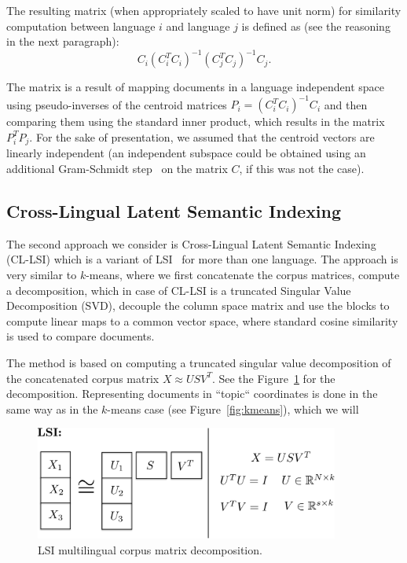 \documentclass[twoside,11pt]{article}
\begin{document}
The resulting matrix (when appropriately scaled to have unit norm) for similarity computation between language $i$ and language $j$ is defined as (see the reasoning in the next paragraph):
$$C_i(C_i^T C_i)^{-1} (C_j^T C_j)^{-1} C_j.$$

The matrix is a result of mapping documents in a language independent space using pseudo-inverses of the centroid matrices $P_i = (C_i^T C_i)^{-1} C_i$ and then comparing them using the standard inner product, which results in the matrix $P_i^T P_j$. For the sake of presentation, we assumed that the centroid vectors are linearly independent (an independent subspace could be obtained using an additional Gram-Schmidt step~\cite{golub} on the matrix $C$, if this was not the case).

\subsection{Cross-Lingual Latent Semantic Indexing}\label{sec:LSI}

The second approach we consider is Cross-Lingual Latent Semantic Indexing (CL-LSI)\cite{cl_lsi} which is a variant of LSI~ for more than one language. The approach is very similar to $k$-means, where we first concatenate the corpus matrices, compute a decomposition, which in case of CL-LSI is a truncated Singular Value Decomposition (SVD), decouple the
 column space matrix and use the blocks to compute linear maps to a common vector space, where standard cosine similarity is used to compare documents.

 The method is based on computing a truncated singular value decomposition of the concatenated corpus matrix $X \approx U S V^T$. See the Figure~\ref{fig:lsi} for the decomposition. Representing documents in ``topic`` coordinates is done in the same way as in the $k$-means case (see Figure~\ref{fig:kmeans}), which we will

\begin{figure}[tbp]
\centering
\includegraphics[width=10cm]{lsi.pdf}
\caption{\label{fig:lsi} LSI multilingual corpus matrix decomposition.}
\end{figure}
\end{document}
